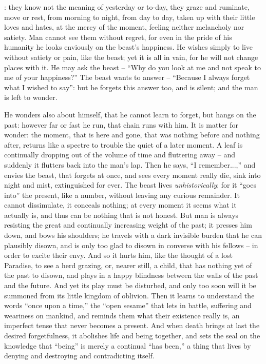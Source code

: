 
: they know not the meaning
of yesterday or to-day, they graze and ruminate, move or rest, from
morning to night, from day to day, taken up with their little loves
and hates, at the mercy of the moment, feeling neither melancholy nor
satiety. Man cannot see them without regret, for even in the pride of
his humanity he looks enviously on the beast's happiness. He wishes
simply to live without satiety or pain, like the beast; yet it is all
in vain, for he will not change places with it. He may ask the
beast -- \enquote{Why do you look at me and not speak to me of your happiness?}
The beast wants to answer -- \enquote{Because I always forget what I wished to
say}: but he forgets this answer too, and is silent; and the man is
left to wonder.

He wonders also about himself, that he cannot learn to forget, but
hangs on the past: however far or fast he run, that chain runs with
him. It is matter for wonder: the moment, that is here and gone, that
was nothing before and nothing after, returns like a spectre to
trouble the quiet of a later moment. A leaf is continually dropping
out of the volume of time and fluttering away -- and suddenly it
flutters back into the man's lap. Then he says, \enquote{I remember...,} and
envies the beast, that forgets at once, and sees every moment really
die, sink into night and mist, extinguished for ever. The beast lives
\textit{unhistorically}; for it \enquote{goes into} the present, like a number,
without leaving any curious remainder. It cannot dissimulate, it
conceals nothing; at every moment it seems what it actually is, and
thus can be nothing that is not honest. But man is always resisting
the great and continually increasing weight of the past; it presses
him down, and bows his shoulders; he travels with a dark invisible
burden that he can plausibly disown, and is only too glad to disown
in converse with his fellows -- in order to excite their envy. And so
it hurts him, like the thought of a lost Paradise, to see a herd
grazing, or, nearer still, a child, that has nothing yet of the past
to disown, and plays in a happy blindness between the walls of the
past and the future. And yet its play must be disturbed, and only too
soon will it be summoned from its little kingdom of oblivion. Then it
learns to understand the words \enquote{once upon a time,} the \enquote{open sesame}
that lets in battle, suffering and weariness on mankind, and reminds
them what their existence really is, an imperfect tense that never
becomes a present. And when death brings at last the desired
forgetfulness, it abolishes life and being together, and sets the
seal on the knowledge that \enquote{being} is merely a continual \enquote{has been,}
a thing that lives by denying and destroying and contradicting
itself.

